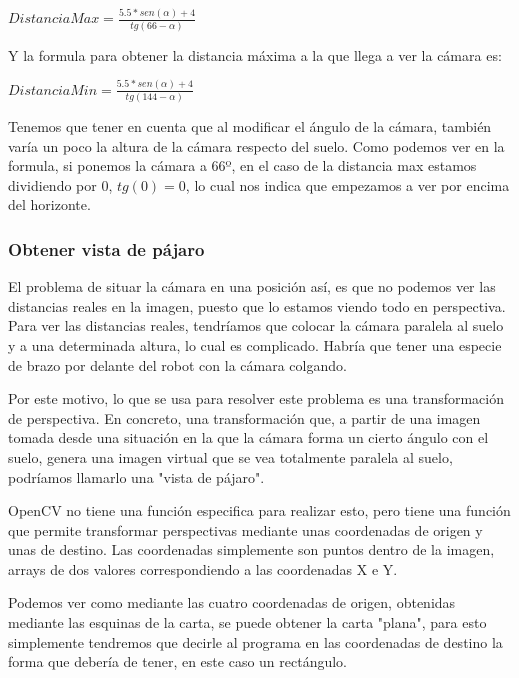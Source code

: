 $DistanciaMax = \displaystyle \frac{5.5*sen(\alpha) + 4}{tg(66-\alpha)}$

Y la formula para obtener la distancia máxima a la que llega a ver la cámara es:

$DistanciaMin = \displaystyle \frac{5.5*sen(\alpha) + 4}{tg(144-\alpha)}$

Tenemos que tener en cuenta que al modificar el ángulo de la cámara, también varía un poco la altura de la cámara respecto del suelo.
Como podemos ver en la formula, si ponemos la cámara a 66º, en el caso de la distancia max estamos dividiendo por 0, $tg(0) = 0$, lo cual nos indica que empezamos a ver por encima del horizonte.


\subsubsection{Obtener vista de pájaro}

El problema de situar la cámara en una posición así, es que no podemos ver las distancias reales en la imagen, puesto que lo estamos viendo todo en perspectiva. Para ver las distancias reales, tendríamos que colocar la cámara paralela al suelo y a una determinada altura, lo cual es complicado. Habría que tener una especie de brazo por delante del robot con la cámara colgando.

Por este motivo, lo que se usa para resolver este problema es una transformación de perspectiva\cite{trans_p}. En concreto, una transformación que, a partir de una imagen tomada desde una situación en la que la cámara forma un cierto ángulo con el suelo, genera una imagen virtual que se vea totalmente paralela al suelo, podríamos llamarlo una "vista de pájaro"\cite{bird}.


OpenCV no tiene una función especifica para realizar esto, pero tiene una función que permite transformar perspectivas mediante unas coordenadas de origen y unas de destino\cite{persp_trans}. Las coordenadas simplemente son puntos dentro de la imagen, arrays de dos valores correspondiendo a las coordenadas X e Y.


Podemos ver como mediante las cuatro coordenadas de origen, obtenidas mediante las esquinas de la carta, se puede obtener la carta "plana", para esto simplemente tendremos que decirle al programa en las coordenadas de destino la forma que debería de tener, en este caso un rectángulo.

